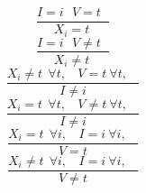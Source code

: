 $$\frac{I=i ~~~V=t ~~~}{X_{i}=t~}$$ $$\frac{I=i ~~~V \neq t ~~~}{X_{i} \neq t~}$$ $$\frac{X_{i} \neq t~~\forall t,~~~~V=t ~\forall t,~~~~}{I \neq i }$$ $$\frac{X_{i}=t~~\forall t,~~~~V \neq t ~\forall t,~~~~}{I \neq i }$$ $$\frac{X_{i}=t~~\forall i,~~~~I=i ~\forall i,~~~~}{V=t }$$ $$\frac{X_{i} \neq t~~\forall i,~~~~I=i ~\forall i,~~~~}{V \neq t }$$ 